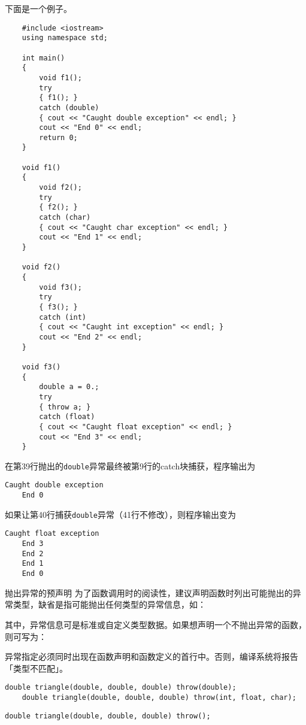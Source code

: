 \documentclass[10pt, a4paper, oneside, fontset=none]{ctexart}
\theoremstyle{plain}
\theoremstyle{definition}
\newcommand{\zhu}[2][]{\begin{note}{#1}\xiu #2\end{note}}
\begin{document}
下面是一个例子。

\begin{lstlisting}
	#include <iostream>
	using namespace std;
	
	int main() 
	{
		void f1();
		try 
		{ f1(); }
		catch (double) 
		{ cout << "Caught double exception" << endl; }
		cout << "End 0" << endl;
		return 0;
	}
	
	void f1() 
	{
		void f2();
		try 
		{ f2(); }
		catch (char) 
		{ cout << "Caught char exception" << endl; }
		cout << "End 1" << endl;
	}
	
	void f2()
	{
		void f3();
		try 
		{ f3(); }
		catch (int) 
		{ cout << "Caught int exception" << endl; }
		cout << "End 2" << endl;
	}
	
	void f3()
	{
		double a = 0.;
		try 
		{ throw a; }
		catch (float) 
		{ cout << "Caught float exception" << endl; }
		cout << "End 3" << endl;
	}
\end{lstlisting}
在第39行抛出的\texttt{double}异常最终被第9行的catch块捕获，程序输出为
\begin{lstlisting}[style=output]
	Caught double exception
	End 0
\end{lstlisting}
如果让第40行捕获\texttt{double}异常（41行不修改），则程序输出变为
\begin{lstlisting}[style=output]
	Caught float exception
	End 3
	End 2
	End 1
	End 0
\end{lstlisting}

\zhu[抛出异常的预声明]{
	为了函数调用时的阅读性，建议声明函数时列出可能抛出的异常类型，缺省是指可能抛出任何类型的异常信息，如：
	\vspace{3.2\baselineskip}

	其中，异常信息可是标准或自定义类型数据。如果想声明一个不抛出异常的函数，则可写为：

	\vspace{2.5\baselineskip}
	异常指定必须同时出现在函数声明和函数定义的首行中。否则，编译系统将报告「类型不匹配」。
}
\vspace{-8.7\baselineskip}
\begin{lstlisting}[style=notec]
	double triangle(double, double, double) throw(double);
	double triangle(double, double, double) throw(int, float, char);
\end{lstlisting}
\vspace{0.8\baselineskip}
\begin{lstlisting}[style=notec]
	double triangle(double, double, double) throw();
\end{lstlisting}
\vspace{2\baselineskip}
\end{document}
